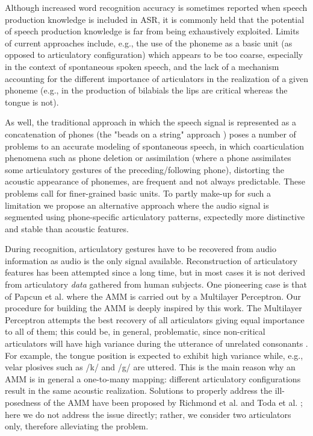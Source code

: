 \documentclass{pnastwo}
\begin{document}
\begin{article}
Although increased word recognition accuracy is sometimes reported when speech production
knowledge is included in ASR, it is commonly held that the potential of speech production
knowledge is far from being exhaustively exploited. Limits of current approaches include, e.g.,
the use of the phoneme as a basic unit (as opposed to articulatory configuration)
which appears to be too coarse, especially in the context of spontaneous spoken speech,
and the lack of a mechanism accounting for the different importance of articulators in the
realization of a given phoneme (e.g., in the production of bilabials the lips are critical whereas
the tongue is not).

As well, the traditional approach in which the speech signal is represented as a concatenation of phones 
(the "beads on a string" approach \cite{ostendorf}) poses a number of problems to an accurate modeling of
spontaneous speech, in which coarticulation phenomena such as phone deletion or assimilation (where a phone assimilates some articulatory gestures of the preceding/following phone),
distorting the acoustic appearance of phonemes, are frequent and not always predictable. These problems
call for finer-grained basic units. To partly make-up for such a limitation we propose
an alternative approach where the audio signal is segmented using phone-specific articulatory patterns,
expectedly more distinctive and stable than acoustic features.

During recognition, articulatory gestures have to be recovered 
from audio information as audio is the only signal available.
Reconstruction of articulatory features has been attempted since a long
time, but in most cases it is not derived from articulatory \emph{data}
gathered from human subjects. One pioneering case is that of Papcun
et al. \cite{papcun} where the AMM is carried out by a Multilayer Perceptron.
Our procedure for building the AMM is deeply inspired by this work.
The Multilayer Perceptron attempts the best recovery of all articulators giving equal importance
to all of them; this could be, in general, problematic, since non-critical articulators will have
high variance during the utterance of unrelated consonants \cite{papcun,rose}.
For example, the tongue position is expected to exhibit high variance while, e.g., velar plosives
such as /k/ and /g/ are uttered. This is the main reason why an AMM is in general a one-to-many mapping: different articulatory configurations result in the same acoustic realization. Solutions to properly address the ill-posedness
of the AMM have been proposed by Richmond et al. \cite{richmond} and Toda et al. \cite{toda}; here we do
not address the issue directly; rather, we consider two articulators only, therefore alleviating the problem.


\end{article}
\end{document}
